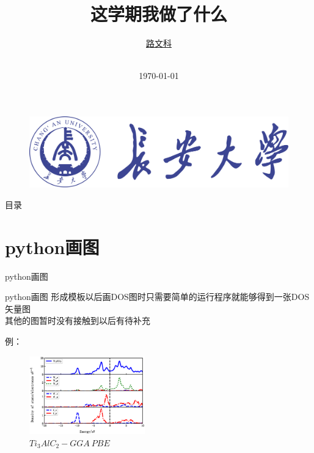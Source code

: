 \documentclass{beamer}
\author[\text{路文科}~luwenke420@outlook.com\contact]{\href{}{路文科}}%
\institute[\text{材料科学与工程学院}]{\href{}{Chang'an University}
    \\ \smallskip \contact}
\title[]%
{这学期我做了什么}
\subtitle[\shortconference]{}%
\date[\today]{\fullconference
    \\ \small \today}
\begin{document}
{

\begin{frame}\label{start}
    \titlepage
    \begin{figure}
            \includegraphics[scale=0.03]{style/chdbluelogo.pdf} 
    \end{figure}
\end{frame}
}

\begin{frame}{目录}
    \tableofcontents[sectionstyle=show, subsectionstyle=show/shaded/hide, subsubsectionstyle=show/shaded/hide]
\end{frame}


\section{python画图}

\begin{frame}{python画图}
	
    \begin{block}{python画图}
    	形成模板以后画DOS图时只需要简单的运行程序就能够得到一张DOS矢量图\\
    	其他的图暂时没有接触到以后有待补充
    \end{block}
      例：
      
	\begin{figure}
		\centering
		\includegraphics[width=5cm]{images/Figure_1.eps}
		\caption{$Ti_{3}AlC_{2}-GGA~PBE$}
		\label{fig:Figure_1}
	\end{figure}
\end{frame}
\end{document}
